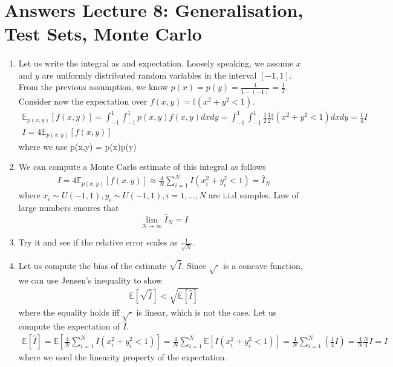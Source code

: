 \section{Answers Lecture 8: Generalisation, Test Sets, Monte Carlo}

\paragraph{}
\begin{enumerate}[label=\alph*.]
\item Let us write the integral as and expectation. Loosely speaking, we assume $x$ and $y$ are uniformly distributed random variables in the interval $[-1,1]$. From the previous assumption, we know $p(x) = p(y) = \frac{1}{1 - (-1)} = \frac{1}{2}$. Consider now the expectation over $f(x,y) = \mathbb{I}(x^2 + y^2 < 1)$.
\begin{align}
\mathbb{E}_{p(x,y)}\left[f(x,y)\right] = \int_{-1}^{1}\int_{-1}^{1}p(x,y)f(x,y)dxdy = \int_{-1}^{1}\int_{-1}^{1}\frac{1}{2}\frac{1}{2}\mathbb{I}(x^2 + y^2 < 1)dxdy = \frac{1}{4}I\\
I = 4\mathbb{E}_{p(x,y)}\left[f(x,y)\right]
\end{align}
where we use p(x,y) = p(x)p(y)

\item We can compute a Monte Carlo estimate of this integral as follows
\begin{align}
I = 4\mathbb{E}_{p(x,y)}\left[f(x,y)\right] \approx \frac{4}{N}\sum_{i=1}^N I(x_i^2 + y_i^2 < 1) = \hat{I}_N
\end{align}
where $x_i\sim U(-1,1), y_i\sim U(-1,1), i=1,\dots,N$ are i.i.d samples. Law of large numbers ensures that 
\begin{equation}
\lim_{N\rightarrow\infty}\hat{I}_N = I
\end{equation}

\item Try it and see if the relative error scales as $\frac{1}{\sqrt{N}}$.

\item Let us compute the bias of the estimate $\sqrt{\hat{I}}$. Since $\sqrt{\cdot}$ is a concave function, we can use Jensen's inequality to show
\begin{align}
\mathbb{E}\left[\sqrt{\hat{I}}\right] < \sqrt{\mathbb{E}\left[\hat{I}\right]}
\end{align}
where the equality holds iff $\sqrt{\cdot}$ is linear, which is not the case. Let us compute the expectation of $\hat{I}$.
\begin{align}
\mathbb{E}\left[\hat{I}\right] = \mathbb{E}\left[\frac{4}{N}\sum_{i=1}^N I(x_i^2 + y_i^2 < 1)\right] = \frac{4}{N}\sum_{i=1}^N \mathbb{E}\left[I(x_i^2 + y_i^2 < 1)\right] = \frac{4}{N}\sum_{i=1}^N \left(\frac{1}{4} I \right) = \frac{4}{N}\frac{N}{4}I = I
\end{align}
where we used the linearity property of the expectation.


\end{enumerate}
